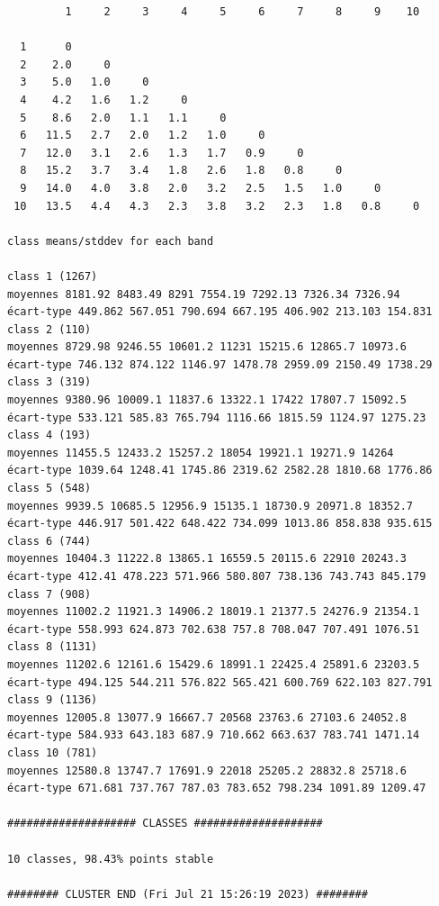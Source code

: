 \documentclass[environments,article,submit,pdftex,moreauthors]{Definitions/mdpi}
\begin{document}
\begin{scriptsize}
\begin{verbatim}
         1     2     3     4     5     6     7     8     9    10

  1      0
  2    2.0     0
  3    5.0   1.0     0
  4    4.2   1.6   1.2     0
  5    8.6   2.0   1.1   1.1     0
  6   11.5   2.7   2.0   1.2   1.0     0
  7   12.0   3.1   2.6   1.3   1.7   0.9     0
  8   15.2   3.7   3.4   1.8   2.6   1.8   0.8     0
  9   14.0   4.0   3.8   2.0   3.2   2.5   1.5   1.0     0
 10   13.5   4.4   4.3   2.3   3.8   3.2   2.3   1.8   0.8     0

class means/stddev for each band

class 1 (1267)
moyennes 8181.92 8483.49 8291 7554.19 7292.13 7326.34 7326.94
écart-type 449.862 567.051 790.694 667.195 406.902 213.103 154.831
class 2 (110)
moyennes 8729.98 9246.55 10601.2 11231 15215.6 12865.7 10973.6
écart-type 746.132 874.122 1146.97 1478.78 2959.09 2150.49 1738.29
class 3 (319)
moyennes 9380.96 10009.1 11837.6 13322.1 17422 17807.7 15092.5
écart-type 533.121 585.83 765.794 1116.66 1815.59 1124.97 1275.23
class 4 (193)
moyennes 11455.5 12433.2 15257.2 18054 19921.1 19271.9 14264
écart-type 1039.64 1248.41 1745.86 2319.62 2582.28 1810.68 1776.86
class 5 (548)
moyennes 9939.5 10685.5 12956.9 15135.1 18730.9 20971.8 18352.7
écart-type 446.917 501.422 648.422 734.099 1013.86 858.838 935.615
class 6 (744)
moyennes 10404.3 11222.8 13865.1 16559.5 20115.6 22910 20243.3
écart-type 412.41 478.223 571.966 580.807 738.136 743.743 845.179
class 7 (908)
moyennes 11002.2 11921.3 14906.2 18019.1 21377.5 24276.9 21354.1
écart-type 558.993 624.873 702.638 757.8 708.047 707.491 1076.51
class 8 (1131)
moyennes 11202.6 12161.6 15429.6 18991.1 22425.4 25891.6 23203.5
écart-type 494.125 544.211 576.822 565.421 600.769 622.103 827.791
class 9 (1136)
moyennes 12005.8 13077.9 16667.7 20568 23763.6 27103.6 24052.8
écart-type 584.933 643.183 687.9 710.662 663.637 783.741 1471.14
class 10 (781)
moyennes 12580.8 13747.7 17691.9 22018 25205.2 28832.8 25718.6
écart-type 671.681 737.767 787.03 783.652 798.234 1091.89 1209.47

#################### CLASSES ####################

10 classes, 98.43% points stable

######## CLUSTER END (Fri Jul 21 15:26:19 2023) ########
\end{verbatim}
\end{scriptsize}
\end{document}
